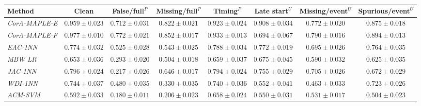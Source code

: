 \begin{tabular*}{\textwidth}{@{\extracolsep{\fill}}lccccccc@{}}
\toprule
Method & Clean & False/full$^{P}$ & Missing/full$^{P}$ & Timing$^{P}$ & Late start$^{U}$ & Missing/event$^{U}$ & Spurious/event$^{U}$ \\
\midrule
\emph{CorA-MAPLE-E} & $0.959\pm0.023$ & $0.712\pm0.031$ & $0.822\pm0.021$ & $0.923\pm0.024$ & $\mathbf{0.908}\pm0.034$ & $0.772\pm0.020$ & $0.875\pm0.018$ \\
\emph{CorA-MAPLE-F} & $\mathbf{0.977}\pm0.010$ & $\mathbf{0.772}\pm0.021$ & $\mathbf{0.852}\pm0.017$ & $\mathbf{0.933}\pm0.013$ & $0.694\pm0.067$ & $\mathbf{0.790}\pm0.016$ & $\mathbf{0.894}\pm0.013$ \\
\emph{EAC-1NN} & $0.774\pm0.032$ & $0.525\pm0.028$ & $0.543\pm0.025$ & $0.788\pm0.034$ & $0.772\pm0.019$ & $0.695\pm0.026$ & $0.764\pm0.035$ \\
\emph{MBW-LR} & $0.653\pm0.036$ & $0.293\pm0.020$ & $0.504\pm0.018$ & $0.659\pm0.037$ & $0.675\pm0.045$ & $0.590\pm0.032$ & $0.625\pm0.035$ \\
\emph{JAC-1NN} & $0.796\pm0.024$ & $0.217\pm0.026$ & $0.646\pm0.017$ & $0.794\pm0.024$ & $0.755\pm0.029$ & $0.705\pm0.026$ & $0.672\pm0.029$ \\
\emph{WDI-1NN} & $0.744\pm0.037$ & $0.480\pm0.035$ & $0.330\pm0.035$ & $0.740\pm0.036$ & $0.552\pm0.041$ & $0.463\pm0.033$ & $0.723\pm0.026$ \\
\emph{ACM-SVM} & $0.592\pm0.033$ & $0.180\pm0.011$ & $0.206\pm0.023$ & $0.658\pm0.024$ & $0.550\pm0.031$ & $0.531\pm0.017$ & $0.504\pm0.023$ \\
\bottomrule
\end{tabular*}
